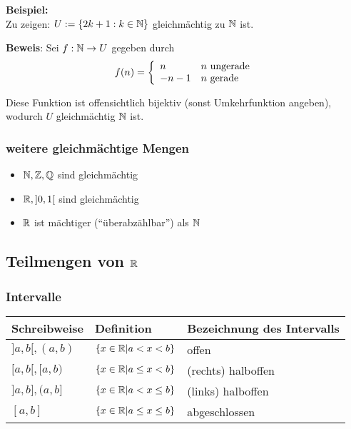 \textbf{Beispiel:}\\
Zu zeigen: $U := \{ 2k + 1: k \in \mathbb{N} \}$ gleichmächtig zu $\mathbb{N}$ ist.

\textbf{Beweis}: Sei $f: \mathbb{N} \rightarrow U$ gegeben durch
\begin{equation*}
f(n) = \left\{
	\begin{array}{l l}
		n & n \text{ ungerade}\\
		-n - 1 & n \text{ gerade}
	\end{array}
\right.
\end{equation*}

Diese Funktion ist offensichtlich bijektiv (sonst Umkehrfunktion angeben), wodurch $U$ gleichmächtig $\mathbb{N}$ ist.

\subsubsection{weitere gleichmächtige Mengen}
\begin{itemize}
	\item $\mathbb{N}, \mathbb{Z}, \mathbb{Q}$ sind gleichmächtig
	\item $\mathbb{R}, ]0,1[$ sind gleichmächtig
	\item $\mathbb{R}$ ist mächtiger (``überabzählbar'') als $\mathbb{N}$
\end{itemize}

\subsection{Teilmengen von $\mathbb{R}$}
\subsubsection{Intervalle}
\begin{tabular}{|l|l|l|}\hline
Schreibweise & Definition & Bezeichnung des Intervalls\\\hline
$]a, b[, (a,b)$ & $\{x \in \mathbb{R} | a < x < b\}$ & offen\\\hline
$[a, b[, [a, b)$ & $\{x \in \mathbb{R} | a \leq x < b\}$ & (rechts) halboffen \\\hline
$]a,b], (a, b]$ & $\{x \in \mathbb{R} | a < x \leq b\}$ & (links) halboffen \\\hline
$[a,b]$ & $\{x \in \mathbb{R} | a \leq x \leq b\}$ & abgeschlossen \\\hline
\end{tabular}

